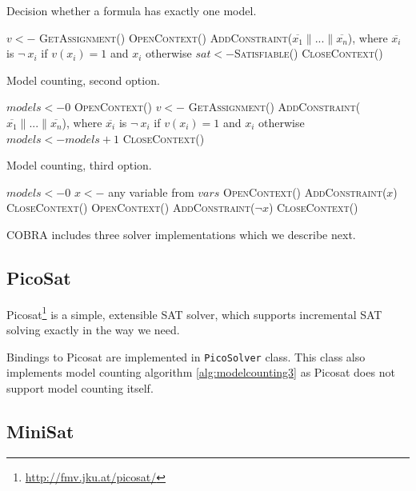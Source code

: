 \begin{algorithm}[h]
\caption{Decision whether a formula has exactly one model.}
\label{alg:onlyonemodel}
\DontPrintSemicolon
{}
$v <- $ \textsc{GetAssignment()}\;
\textsc{OpenContext()}\;
\textsc{AddConstraint($\overline{x_1}\| ... \|\overline{x_n}$)},
  where $\overline{x_i}$ is $\neg\:x_i$ if $v(x_i) = 1$ and $x_i$ otherwise\;
$sat <- $\textsc{Satisfiable()}\;
\textsc{CloseContext()}\;
\end{algorithm}
\begin{algorithm}[h]
\caption{Model counting, second option.}
\label{alg:modelcounting2}
\DontPrintSemicolon
$models <- 0$\;
\textsc{OpenContext()}\;
 {
  $v <- $ \textsc{GetAssignment()}\;
  \textsc{AddConstraint($\overline{x_1}\| ... \|\overline{x_n}$)},
    where $\overline{x_i}$ is $\neg\:x_i$ if $v(x_i) = 1$ and $x_i$ otherwise\;
  $models <- models + 1$\;
}
\textsc{CloseContext()}\;
\end{algorithm}
\begin{algorithm}[h!]
\caption{Model counting, third option.}
\label{alg:modelcounting3}
\DontPrintSemicolon
$models <- 0$\;
$x <- $ any variable from $vars$\;
\textsc{OpenContext()}\;
\textsc{AddConstraint}($x$)\;
\textsc{CloseContext()}\;
\textsc{OpenContext()}\;
\textsc{AddConstraint}($\neg x$)\;
\textsc{CloseContext()}\;
\end{algorithm}

COBRA includes three solver implementations which we describe next.

\subsection{PicoSat}
Picosat\footnote{\url{http://fmv.jku.at/picosat/}} \cite{picosat} is a simple,
  extensible SAT solver, which supports incremental SAT solving exactly in the way
  we need.

Bindings to Picosat are implemented in \texttt{PicoSolver} class.
This class also implements model counting algorithm \ref{alg:modelcounting3}
 as Picosat does not support model counting itself.


\subsection{MiniSat}

